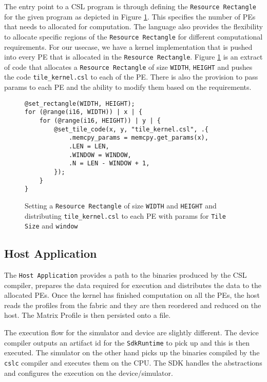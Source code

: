 The entry point to a CSL program is through defining the \texttt{Resource Rectangle} for the given program as depicted in Figure \ref{code:distribute_kernel}. This specifies the number of PEs that needs to allocated for computation. The language also provides the flexibility to allocate specific regions of the \texttt{Resource Rectangle} for different computational requirements. For our usecase, we have a kernel implementation that is pushed into every PE that is allocated in the \texttt{Resource Rectangle}. Figure \ref{code:distribute_kernel} is an extract of code that allocates a \texttt{Resource Rectangle} of size \texttt{WIDTH}, \texttt{HEIGHT} and pushes the code \texttt{tile\_kernel.csl} to each of the PE. There is also the provision to pass params to each PE and the ability to modify them based on the requirements.

\begin{figure}[!ht]
    \centering
    \begin{verbatim}
@set_rectangle(WIDTH, HEIGHT);
for (@range(i16, WIDTH)) | x | {
    for (@range(i16, HEIGHT)) | y | {
        @set_tile_code(x, y, "tile_kernel.csl", .{ 
            .memcpy_params = memcpy.get_params(x),
            .LEN = LEN,
            .WINDOW = WINDOW,
            .N = LEN - WINDOW + 1,
        });
    }
}
\end{verbatim}
\caption{Setting a \texttt{Resource Rectangle} of size \texttt{WIDTH} and \texttt{HEIGHT} and distributing \texttt{tile\_kernel.csl} to each PE with params for \texttt{Tile Size} and \texttt{window}}
\label{code:distribute_kernel}
\end{figure}

\subsection{Host Application} \label{subsection:host}

The \texttt{Host Application} provides a path to the binaries produced by the CSL compiler, prepares the data required for execution and distributes the data to the allocated PEs.
Once the kernel has finished computation on all the PEs, the host reads the profiles from the fabric and they are then reordered and reduced on the host. The Matrix Profile is then persisted onto a file.

The execution flow for the simulator and device are slightly different. The device compiler outputs an artifact id for the \texttt{SdkRuntime} to pick up and this is then executed.
The simulator on the other hand picks up the binaries compiled by the \texttt{cslc} compiler and executes them on the CPU. The SDK handles the abstractions and configures the execution on the device/simulator.

